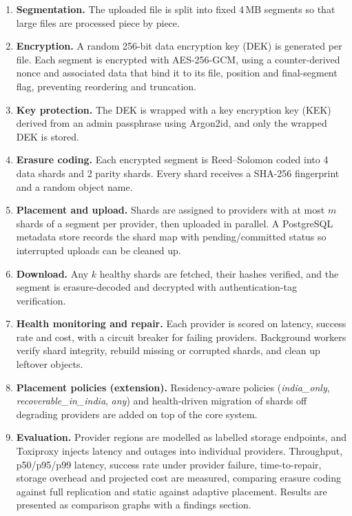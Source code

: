 \documentclass[11pt,a4paper]{article}
\begin{document}
\begin{enumerate}[leftmargin=*,label=\textbf{Step \arabic*:},itemsep=4pt]
  \item \textbf{Segmentation.} The uploaded file is split into fixed 4\,MB segments so that large files
        are processed piece by piece.
  \item \textbf{Encryption.} A random 256-bit data encryption key (DEK) is generated per file. Each
        segment is encrypted with AES-256-GCM, using a counter-derived nonce and associated data that bind
        it to its file, position and final-segment flag, preventing reordering and truncation.
  \item \textbf{Key protection.} The DEK is wrapped with a key encryption key (KEK) derived from an admin
        passphrase using Argon2id, and only the wrapped DEK is stored.
  \item \textbf{Erasure coding.} Each encrypted segment is Reed--Solomon coded into 4 data shards and 2
        parity shards. Every shard receives a SHA-256 fingerprint and a random object name.
  \item \textbf{Placement and upload.} Shards are assigned to providers with at most $m$ shards of a
        segment per provider, then uploaded in parallel. A PostgreSQL metadata store records the shard
        map with pending/committed status so interrupted uploads can be cleaned up.
  \item \textbf{Download.} Any $k$ healthy shards are fetched, their hashes verified, and the segment is
        erasure-decoded and decrypted with authentication-tag verification.
  \item \textbf{Health monitoring and repair.} Each provider is scored on latency, success rate and cost,
        with a circuit breaker for failing providers. Background workers verify shard integrity, rebuild
        missing or corrupted shards, and clean up leftover objects.
  \item \textbf{Placement policies (extension).} Residency-aware policies (\emph{india\_only},
        \emph{recoverable\_in\_india}, \emph{any}) and health-driven migration of shards off degrading
        providers are added on top of the core system.
  \item \textbf{Evaluation.} Provider regions are modelled as labelled storage endpoints, and Toxiproxy
        injects latency and outages into individual providers. Throughput, p50/p95/p99 latency, success
        rate under provider failure, time-to-repair, storage overhead and projected cost are measured,
        comparing erasure coding against full replication and static against adaptive placement.
        Results are presented as comparison graphs with a findings section.
\end{enumerate}
\end{document}
